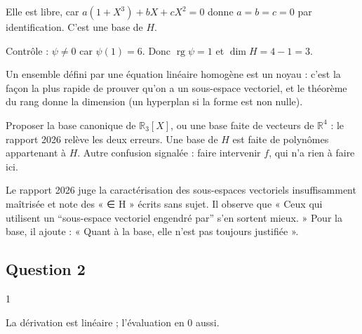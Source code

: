 \documentclass[11pt,a4paper]{article}
\newcommand{\equationajustee}[1]{%
  \sbox{\boiteequation}{$\displaystyle #1$}%
  \ifdim\wd\boiteequation>\linewidth
    \[\resizebox{\linewidth}{!}{\usebox{\boiteequation}}\]%
  \else
    \[#1\]%
  \fi}
\begin{document}
Elle est libre, car \(a(1+X^3)+bX+cX^2=0\) donne \(a=b=c=0\) par identification. C'est une base de \(H\).

\equationajustee{\boxed{\begin{aligned}
H&=\operatorname{Vect}(1+X^3,X,X^2),\\
\dim H&=3.
\end{aligned}}}

Contrôle : \(\psi\neq0\) car \(\psi(1)=6\). Donc \(\operatorname{rg}\psi=1\) et \(\dim H=4-1=3\).

\begin{methode}

Un ensemble défini par une équation linéaire homogène est un noyau : c'est la façon la plus rapide de prouver qu'on a un sous-espace vectoriel, et le théorème du rang donne la dimension (un hyperplan si la forme est non nulle).

\end{methode}

\begin{piege}

Proposer la base canonique de \({\mathbb{R}}_3[X]\), ou une base faite de vecteurs de \({\mathbb{R}}^4\) : le rapport 2026 relève les deux erreurs. Une base de \(H\) est faite de polynômes appartenant à \(H\). Autre confusion signalée : faire intervenir \(f\), qui n'a rien à faire ici.

\end{piege}

\begin{jury}

Le rapport 2026 juge la caractérisation des sous-espaces vectoriels insuffisamment maîtrisée et note des « ∈ H » écrits sans sujet. Il observe que « Ceux qui utilisent un ``sous-espace vectoriel engendré par'' s'en sortent mieux. » Pour la base, il ajoute : « Quant à la base, elle n'est pas toujours justifiée ».

\end{jury}

\hypertarget{question-2}{%
\subsection{Question 2}\label{question-2}}

\begin{indication}{1}

La dérivation est linéaire ; l'évaluation en \(0\) aussi.

\end{indication}
\end{document}
